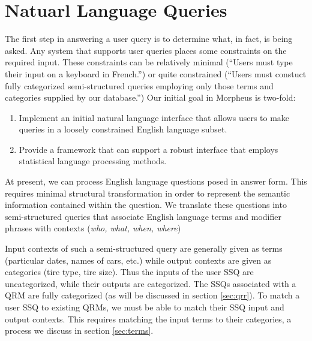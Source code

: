 \section{Natuarl Language Queries}
The first step in answering a user query is to determine what, in
fact, is being asked.  Any system that supports user queries places
some constraints on the required input.  These constraints can be
relatively minimal (``Users must type their input on a keyboard in
French.'') or quite constrained (``Users must constuct fully
categorized semi-structured queries employing only those terms and
categories supplied by our database.'')  Our initial goal in Morpheus
is two-fold:

\begin{enumerate}
\item Implement an initial natural language interface that allows
  users to make queries in a loosely constrained English language
  subset.
\item Provide a framework that can support a robust
  interface that employs statistical language processing
  methods.  
\end{enumerate}

At present, we can process English language questions posed in answer
form.  This requires minimal structural transformation in order to
represent the semantic information contained within the question.  We
translate these questions into semi-structured queries that associate
English language terms and modifier phrases with contexts (\emph{who,
  what, when, where})

Input contexts of such a semi-structured query are generally given as
terms (particular dates, names of cars, etc.) while output contexts
are given as categories (tire type, tire size). Thus the inputs of the
user SSQ are uncategorized, while their outputs are categorized.  The
SSQs associated with a QRM are fully categorized (as will be discussed
in section \ref{sec:qrr}). To match a user SSQ to existing QRMs, we
must be able to match their SSQ input and output contexts.  This
requires matching the input terms to their categories, a process we
discuss in section \ref{sec:terms}.
